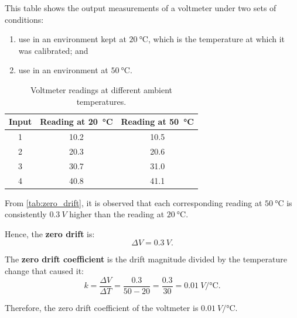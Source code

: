 

This table shows the output measurements of a voltmeter under two sets of conditions:
\begin{enumerate}
    \item use in an environment kept at $20~\si{\celsius}$, which is the temperature at which it was calibrated; and
    \item use in an environment at $50~\si{\celsius}$.
\end{enumerate}

\begin{table}[htbp]
    \centering
    \caption{Voltmeter readings at different ambient temperatures.}
    \begin{tabular}{ccc}
        \toprule
        \textbf{Input} & \textbf{Reading at \SI{20}{\celsius}} & \textbf{Reading at \SI{50}{\celsius}} \\
        \midrule
        1 & 10.2 & 10.5 \\
        2 & 20.3 & 20.6 \\
        3 & 30.7 & 31.0 \\
        4 & 40.8 & 41.1 \\
        \bottomrule
    \end{tabular}
    \label{tab:zero_drift}
\end{table}


\begin{solutionblock}
From \autoref{tab:zero_drift}, it is observed that each corresponding reading at 
$50~\si{\celsius}$ is consistently $\SI{0.3}{V}$ higher than the reading at 
$20~\si{\celsius}$. 

Hence, the \textbf{zero drift} is:
\begin{equation}
    \Delta V = 0.3~\si{V}.
\end{equation}

The \textbf{zero drift coefficient} is the drift magnitude divided by the 
temperature change that caused it:
\begin{equation}
    k = \frac{\Delta V}{\Delta T} = \frac{0.3}{50 - 20} = \frac{0.3}{30} = 0.01~\si{V\per\celsius}.
\end{equation}

Therefore, the zero drift coefficient of the voltmeter is 
$\SI{0.01}{V\per\celsius}$.
\end{solutionblock}
